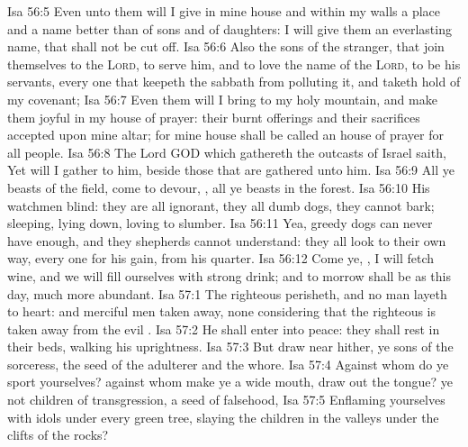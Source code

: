 \vs Isa 56:5 Even unto them will I give in mine house and within my walls a place and a name better than of sons and of daughters: I will give them an everlasting name, that shall not be cut off.
\vs Isa 56:6 Also the sons of the stranger, that join themselves to the \textsc{Lord}, to serve him, and to love the name of the \textsc{Lord}, to be his servants, every one that keepeth the sabbath from polluting it, and taketh hold of my covenant;
\vs Isa 56:7 Even them will I bring to my holy mountain, and make them joyful in my house of prayer: their burnt offerings and their sacrifices  accepted upon mine altar; for mine house shall be called an house of prayer for all people.
\vs Isa 56:8 The Lord GOD which gathereth the outcasts of Israel saith, Yet will I gather  to him, beside those that are gathered unto him.
\vs Isa 56:9 All ye beasts of the field, come to devour, , all ye beasts in the forest.
\vs Isa 56:10 His watchmen  blind: they are all ignorant, they  all dumb dogs, they cannot bark; sleeping, lying down, loving to slumber.
\vs Isa 56:11 Yea,  greedy dogs  can never have enough, and they  shepherds  cannot understand: they all look to their own way, every one for his gain, from his quarter.
\vs Isa 56:12 Come ye, , I will fetch wine, and we will fill ourselves with strong drink; and to morrow shall be as this day,  much more abundant.
\vs Isa 57:1 The righteous perisheth, and no man layeth  to heart: and merciful men  taken away, none considering that the righteous is taken away from the evil .
\vs Isa 57:2 He shall enter into peace: they shall rest in their beds,  walking  his uprightness.
\vs Isa 57:3 But draw near hither, ye sons of the sorceress, the seed of the adulterer and the whore.
\vs Isa 57:4 Against whom do ye sport yourselves? against whom make ye a wide mouth,  draw out the tongue?  ye not children of transgression, a seed of falsehood,
\vs Isa 57:5 Enflaming yourselves with idols under every green tree, slaying the children in the valleys under the clifts of the rocks?
